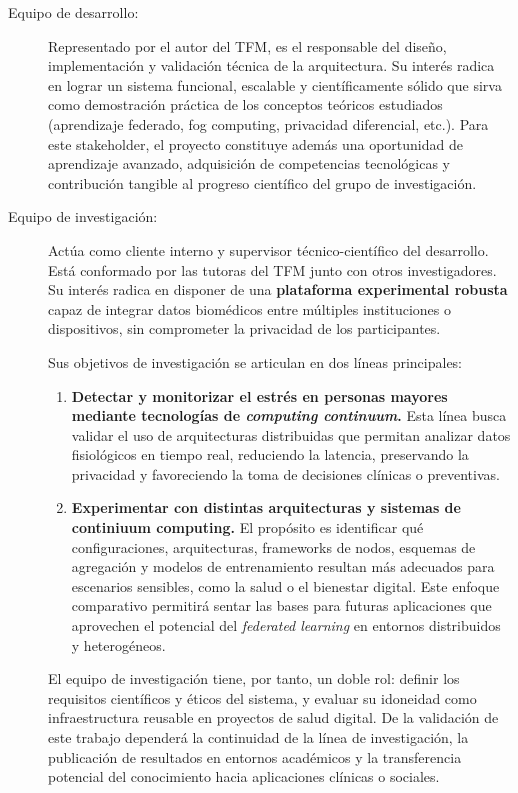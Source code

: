 \documentclass{report}
\begin{document}
\begin{description}
  \item[Equipo de desarrollo:]  
  Representado por el autor del TFM, es el responsable del diseño, implementación y validación técnica de la arquitectura.  
  Su interés radica en lograr un sistema funcional, escalable y científicamente sólido que sirva como demostración práctica de los conceptos teóricos estudiados (aprendizaje federado, fog computing, privacidad diferencial, etc.).  
  Para este stakeholder, el proyecto constituye además una oportunidad de aprendizaje avanzado, adquisición de competencias tecnológicas y contribución tangible al progreso científico del grupo de investigación.

\item[Equipo de investigación:]  
Actúa como cliente interno y supervisor técnico-científico del desarrollo.  
Está conformado por las tutoras del TFM junto con otros investigadores.  
Su interés radica en disponer de una \textbf{plataforma experimental robusta} capaz de integrar datos biomédicos entre múltiples instituciones o dispositivos, sin comprometer la privacidad de los participantes.  

Sus objetivos de investigación se articulan en dos líneas principales:
\begin{enumerate}
    \item \textbf{Detectar y monitorizar el estrés en personas mayores mediante tecnologías de \textit{computing continuum}.}  
    Esta línea busca validar el uso de arquitecturas distribuidas que permitan analizar datos fisiológicos en tiempo real, reduciendo la latencia, preservando la privacidad y favoreciendo la toma de decisiones clínicas o preventivas.
    
    \item \textbf{Experimentar con distintas arquitecturas y sistemas de continiuum computing.}  
    El propósito es identificar qué configuraciones, arquitecturas,  frameworks de nodos, esquemas de agregación y modelos de entrenamiento resultan más adecuados para escenarios sensibles, como la salud o el bienestar digital.  
    Este enfoque comparativo permitirá sentar las bases para futuras aplicaciones que aprovechen el potencial del \textit{federated learning} en entornos distribuidos y heterogéneos.
\end{enumerate}

El equipo de investigación tiene, por tanto, un doble rol: definir los requisitos científicos y éticos del sistema, y evaluar su idoneidad como infraestructura reusable en proyectos de salud digital.  
De la validación de este trabajo dependerá la continuidad de la línea de investigación, la publicación de resultados en entornos académicos y la transferencia potencial del conocimiento hacia aplicaciones clínicas o sociales.

\end{description}
\end{document}
